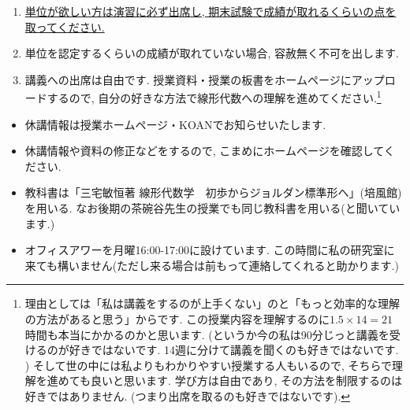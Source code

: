 \documentclass[dvipdfmx,a4paper,11pt]{article}
\theoremstyle{definition}
\begin{document}
\medskip
{}
\begin{enumerate}
  \setlength{\parskip}{0cm} 
  \setlength{\itemsep}{0cm} 
\item \underline{単位が欲しい方は演習に必ず出席し, 期末試験で成績が取れるくらいの点を取ってください.} 
\item 単位を認定するくらいの成績が取れていない場合, 容赦無く不可を出します. 
\item 講義への出席は自由です. 授業資料・授業の板書をホームページにアップロードするので, 自分の好きな方法で線形代数への理解を進めてください.\footnote{理由としては「私は講義をするのが上手くない」のと「もっと効率的な理解の方法があると思う」からです. この授業内容を理解するのに$1.5 \times 14 = 21$時間も本当にかかるのかと思います. (というか今の私は90分じっと講義を受けるのが好きではないです.  14週に分けて講義を聞くのも好きではないです. ) そして世の中には私よりもわかりやすい授業する人もいるので, そちらで理解を進めても良いと思います. 学び方は自由であり, その方法を制限するのは好きではありません. (つまり出席を取るのも好きではないです).}
\end{enumerate}


\vspace{11pt}
\begin{itemize}
  \setlength{\parskip}{0cm} %
  \setlength{\itemsep}{0cm} %
  \item 休講情報は授業ホームページ・KOANでお知らせいたします.
  \item 休講情報や資料の修正などをするので, こまめにホームページを確認してください.
  \item 教科書は「三宅敏恒著 線形代数学　初歩からジョルダン標準形へ」(培風館)を用いる. なお後期の茶碗谷先生の授業でも同じ教科書を用いる(と聞いています.)
   \item オフィスアワーを月曜16:00-17:00に設けています. この時間に私の研究室に来ても構いません(ただし来る場合は前もって連絡してくれると助かります.)
 \end{itemize}
\end{document}
